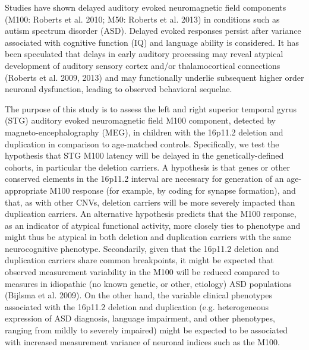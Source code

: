 \documentclass{article}
\begin{document}
\medskip

Studies have shown delayed auditory evoked neuromagnetic field components (M100: Roberts et al. 2010; M50: Roberts et al. 2013) in conditions such as autism spectrum disorder (ASD). Delayed evoked responses persist after variance associated with cognitive function (IQ) and language ability is considered. It has been speculated that delays in early auditory processing may reveal atypical development of auditory sensory cortex and/or thalamocortical connections (Roberts et al. 2009, 2013) and may functionally underlie subsequent higher order neuronal dysfunction, leading to observed behavioral sequelae.  

\medskip

The purpose of this study is to assess the left and right superior temporal gyrus (STG) auditory evoked neuromagnetic field M100 component, detected by magneto-encephalography (MEG), in children with the 16p11.2 deletion and duplication in comparison to age-matched controls. Specifically, we test the hypothesis that STG M100 latency will be delayed in the genetically-defined cohorts, in particular the deletion carriers. A hypothesis is that genes or other conserved elements in the 16p11.2 interval are necessary for generation of an age-appropriate M100 response (for example, by coding for synapse formation), and that, as with other CNVs, deletion carriers will be more severely impacted than duplication carriers. An alternative hypothesis predicts that the M100 response, as an indicator of atypical functional activity, more closely ties to phenotype and might thus be atypical in both deletion and duplication carriers with the same neurocognitive phenotype. Secondarily, given that the 16p11.2 deletion and duplication carriers share common breakpoints, it might be expected that observed measurement variability in the M100 will be reduced compared to measures in idiopathic (no known genetic, or other, etiology) ASD populations (Bijlsma et al. 2009). On the other hand, the variable clinical phenotypes associated with the 16p11.2 deletion and duplication (e.g. heterogeneous expression of ASD diagnosis, language impairment, and other phenotypes, ranging from mildly to severely impaired) might be expected to be associated with increased measurement variance of neuronal indices such as the M100.  

\medskip
\end{document}
